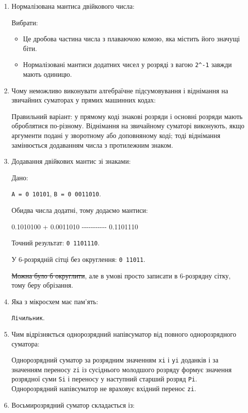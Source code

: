 \documentclass[
  11pt,
]{article}
\newenvironment{Shaded}{}{}
\newcommand{\NormalTok}[1]{#1}
\providecommand{\tightlist}{%
  \setlength{\itemsep}{0pt}\setlength{\parskip}{0pt}}
\begin{document}
\begin{enumerate}
  Для забезпечення однакового формату чисел і точності обчислень, а також для уникнення втрати значущих розрядів при додаванні або відніманні.
\item
  Нормалізована мантиса двійкового числа:

  Вибрати:

  \begin{itemize}
  \tightlist
  \item
    Це дробова частина числа з плаваючою комою, яка містить його значущі біти.
  \item
    Нормалізовані мантиси додатних чисел у розряді з вагою \texttt{2\^{}-1} завжди мають одиницю.
  \end{itemize}
\item
  Чому неможливо виконувати алгебраїчне підсумовування і віднімання на звичайних суматорах у прямих машинних кодах:

  Правильний варіант: у прямому коді знакові розряди і основні розряди мають оброблятися по-різному. Віднімання на звичайному суматорі виконують, якщо аргументи подані у зворотному або доповняному коді; тоді віднімання замінюється додаванням числа з протилежним знаком.
\item
  Додавання двійкових мантис зі знаками:

  Дано:

  \texttt{A\ =\ 0\ 10101}, \texttt{B\ =\ 0\ 0011010}.

  Обидва числа додатні, тому додаємо мантиси:

\begin{Shaded}
\begin{Highlighting}[]
\NormalTok{  0.1010100}
\NormalTok{+ 0.0011010}
\NormalTok{{-}{-}{-}{-}{-}{-}{-}{-}{-}{-}{-}}
\NormalTok{  0.1101110}
\end{Highlighting}
\end{Shaded}

  Точний результат: \texttt{0\ 1101110}.

  У 6-розрядній сітці без округлення: \texttt{0\ 11011}.

  \st{Можна було б округлити}, але в умові просто записати в 6-розрядну сітку, тому беру обрізання.
\item
  Яка з мікросхем має пам'ять:

  \texttt{Лічильник}.
\item
  Чим відрізняється однорозрядний напівсуматор від повного однорозрядного суматора:

  Однорозрядний суматор за розрядним значенням \texttt{xi} і \texttt{yi} доданків і за значенням переносу \texttt{zi} із сусіднього молодшого розряду формує значення розрядної суми \texttt{Si} і переносу у наступний старший розряд \texttt{Pi}. Однорозрядний напівсуматор не враховує вхідний перенос \texttt{zi}.
\item
  Восьмирозрядний суматор складається із:


\end{enumerate}
\end{document}
